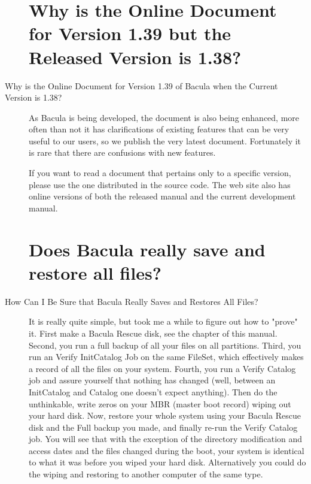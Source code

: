 \begin{description}
\label{docversion}
\section{Why is the Online Document for Version 1.39 but the Released Version is 1.38?}
\item [Why is the Online Document for Version 1.39 of Bacula when the
   Current Version is 1.38?]
As Bacula is being developed, the document is also being enhanced, more
often than not it has clarifications of existing features that can be very
useful to our users, so we publish the very latest document.  Fortunately
it is rare that there are confusions with new features.

If you want to read a document that pertains only to a specific  version,
please use the one distributed in the source code.  The web site also has 
online versions of both the released manual and the current development
manual.

\label{sure}
\section{Does Bacula really save and restore all files?}
\item [How Can I Be Sure that Bacula Really Saves and Restores All Files? ]
   It is really quite simple, but took me a while to figure
   out how to "prove" it.  First make a Bacula Rescue disk, see the
    chapter
   of this manual.
   Second, you run a full backup of all your files on all partitions.
   Third, you run an Verify InitCatalog Job on the same FileSet, which
   effectively makes a record of all the files on your system.  Fourth, you
   run a Verify Catalog job and assure yourself that nothing has changed
   (well, between an InitCatalog and Catalog one doesn't expect anything).
   Then do the unthinkable, write zeros on your MBR (master boot record)
   wiping out your hard disk.  Now, restore your whole system using your
   Bacula Rescue disk and the Full backup you made, and finally re-run the
   Verify Catalog job.  You will see that with the exception of the
   directory modification and access dates and the files changed during the
   boot, your system is identical to what it was before you wiped your hard
   disk.
   Alternatively you could do the wiping and restoring to another computer
   of the same type.

\label{upgrade}

\end{description}
